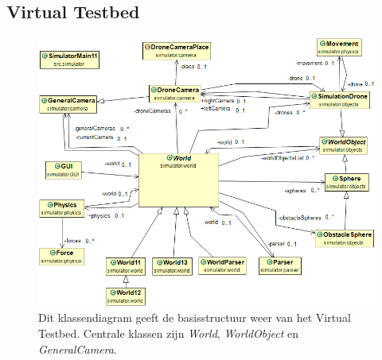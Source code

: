 \subsection{Virtual Testbed}
	\begin{figure}[H]
		\centering
		\includegraphics[width=1\textwidth]{Simulator.png}
		\caption{Dit klassendiagram geeft de basisstructuur weer van het Virtual Testbed. Centrale klassen  zijn \textit{World}, \textit{WorldObject} en \textit{GeneralCamera}.}
	\end{figure}